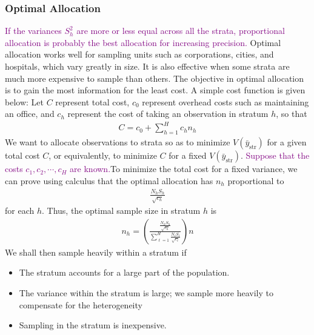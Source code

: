 \documentclass[a4paper,twoside,11pt]{article}
\begin{document}
\subsubsection{Optimal Allocation}
\textcolor{Purple}{If the variances $S_h^2$ are more or less equal across all the strata, proportional allocation is probably the best allocation for increasing precision.}
\newline
\newline
Optimal allocation works well for sampling units such as corporations, cities, and hospitals, which vary greatly in size. It is also effective when some strata are much more expensive to sample than others.
\newline
\newline
The objective in optimal allocation is to gain the most information for the least cost. A simple cost function is given below: Let $C$ represent total cost, $c_0$ represent overhead costs such as maintaining an office, and $c_h$ represent the cost of taking an observation in stratum $h$, so that
\begin{equation*}
\begin{aligned}
C = c_0 + \sum^H_{h=1} c_h n_h
\end{aligned}
\end{equation*}
We want to allocate observations to strata so as to minimize $V(\bar{y}_{\text{str}})$ for a given total cost $C$, or equivalently, to minimize $C$ for a fixed $V(\bar{y}_{\text{str}})$. \textcolor{Purple}{Suppose that the costs $c_1,c_2,\cdots, c_H$ are known.}To minimize the total cost for a fixed variance, we can prove using calculus that the optimal allocation has $n_h$ proportional to
\begin{equation*}
\begin{aligned}
\frac{N_hS_h}{\sqrt{c_h}}
\end{aligned}
\end{equation*}
for each $h$. Thus, the optimal sample size in stratum $h$ is
\begin{equation*}
\begin{aligned}
n_h = (\frac{\frac{N_hS_h}{\sqrt{c_h}}}{\sum^H_{\ell=1}\frac{N_\ell S_\ell}{\sqrt{c_\ell}}} ) n
\end{aligned}
\end{equation*}
We shall then sample heavily within a stratum if
\begin{itemize}
    \item The stratum accounts for a large part of the population.
    \item The variance within the stratum is large; we sample more heavily to compensate for the heterogeneity
    \item Sampling in the stratum is inexpensive.
\end{itemize}
\end{document}
